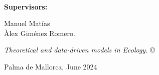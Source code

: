 \documentclass[
	11pt, %
	a4paper, %
]{LegrandOrangeBook}
\begin{document}







\thispagestyle{empty} %

~\vfill %
\sffamily

\noindent \textbf{Supervisors:}

\noindent Manuel Matías \\

\noindent Àlex Giménez Romero.

\noindent \textit{Theoretical and data-driven models in Ecology.} \copyright

\noindent Palma de Mallorca, June 2024
\pagebreak


\newpage
\thispagestyle{plain} %
\mbox{}


% 



\newpage
\thispagestyle{plain} %
\mbox{}
\end{document}
